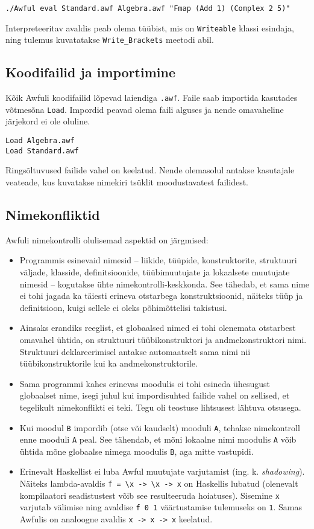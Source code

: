 \documentclass[12pt]{article}
\begin{document}
      \begin{verbatim}./Awful eval Standard.awf Algebra.awf "Fmap (Add 1) (Complex 2 5)"\end{verbatim}

      Interpreteeritav avaldis peab olema tüübist, mis on \verb!Writeable! klassi esindaja, ning tulemus kuvatatakse \verb!Write_Brackets! meetodi abil.
    \subsection{Koodifailid ja importimine}
      Kõik Awfuli koodifailid lõpevad laiendiga \verb!.awf!. Faile saab importida kasutades võtmesõna \verb!Load!. Impordid peavad olema faili alguses ja nende omavaheline järjekord ei ole oluline.

      \begin{verbatim}Load Algebra.awf
Load Standard.awf\end{verbatim}

      Ringsõltuvused failide vahel on keelatud. Nende olemasolul antakse kasutajale veateade, kus kuvatakse nimekiri tsüklit moodustavatest failidest.
    \subsection{Nimekonfliktid}
      Awfuli nimekontrolli olulisemad aspektid on järgmised:

      \begin{itemize}
        \item
          Programmis esinevaid nimesid -- liikide, tüüpide, konstruktorite, struktuuri väljade, klasside, definitsioonide, tüübimuutujate ja lokaalsete muutujate nimesid -- kogutakse ühte nimekontrolli-keskkonda. See tähedab, et sama nime ei tohi jagada ka täiesti erineva otstarbega konstruktsioonid, näiteks tüüp ja definitsioon, kuigi sellele ei oleks põhimõttelisi takistusi.
        \item
          Ainsaks erandiks reeglist, et globaalsed nimed ei tohi olenemata otstarbest omavahel ühtida, on struktuuri tüübikonstruktori ja andmekonstruktori nimi. Struktuuri deklareerimisel antakse automaatselt sama nimi nii tüübikonstruktorile kui ka andmekonstruktorile.
        \item
          Sama programmi kahes erinevas moodulis ei tohi esineda ühesugust globaalset nime, isegi juhul kui impordisuhted failide vahel on sellised, et tegelikult nimekonflikti ei teki. Tegu oli teostuse lihtsusest lähtuva otsusega.
        \item
          Kui moodul \verb!B! impordib (otse või kaudselt) mooduli \verb!A!, tehakse nimekontroll enne mooduli \verb!A! peal. See tähendab, et mõni lokaalne nimi moodulis \verb!A! võib ühtida mõne globaalse nimega moodulis \verb!B!, aga mitte vastupidi.
        \item
          Erinevalt Haskellist ei luba Awful muutujate varjutamist (ing. k. \textit{shadowing}). Näiteks lambda-avaldis \verb!f = \x -> \x -> x! on Haskellis lubatud (olenevalt kompilaatori seadistustest võib see resulteeruda hoiatuses). Sisemine \verb!x! varjutab välimise ning avaldise \verb!f 0 1! väärtustamise tulemuseks on \verb!1!. Samas Awfulis on analoogne avaldis \verb!x -> x -> x! keelatud.
      \end{itemize}
\end{document}

